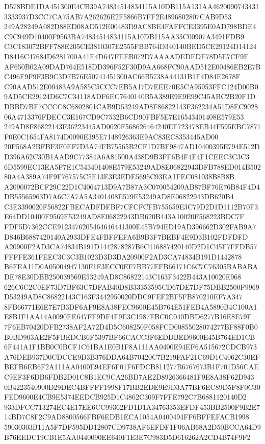 \documentclass[UTF8,fontset=fandol,zihao=-4,a4paper]{ctexart}
\begin{document}
{{D578BDE1DA451300E4CB39A74834514834115A10DB115A131AA46200907434313333937D3CC7CA75AB7A262626E2F5866B7FF2E4896802807CAB9D53
249A28249A082D88ED08AD512E00483D9AC8BE4FAFFCE3395E0AD798BDE4C9C949D10400F9563BA74834514834115A10DB115AA35C00907A3491FDB9
C3C183072BFF788E205CE3810307E2555FBB764D340140BED5CE29124D14124D8416C47684D6281700A41E4D647FEEB072D7AAAADEDEDE78D5E7CF9F
AF650B02A09DAD764E518DD396F52F30D9AA668FC90AAD512E00486EB2E7BC496F9F9F3B9C3D7B76E50741451300AC66B5738A44131B1F4D84E2678F
C90AAD512E00483A9A585C5CCC7EB5A17D7EEE70E5CA95953FFC124D00B09AD5CE29124D6C7C34118ADF6EC7640140B5A389E9E9E99C45ABC2B20F1D
DBBD7BF7CCCC8C6802801CAB9D53249AD8F86822143F362234A51D8EC902806A4713376FDECC3E167CD9C7532B6CD90FBF5E7E16543401408E579E53
249AD8F86822143F36223445AD0020F568626464240EF723478EB44F595EBC7871F0E0C1654FA8174D0090E395E7148926363E9AC83EC8353445AD00
20F568A2BFBF3F0EF7D3A74FB75565B2CF1D7BF9847AD10400395E794E512DD396A62C30B1AAD9C77384A6A81500A438D9B3FF6B4F4F4F1CEEC3C3C3
6D5599EC13EA5F7E1C543401408E579E53249AD8E06822943DFB788ED014B50280A4A389A74F9F767575C5E13E3E3EDE5695C93EA1FEC081038B8B8B
A2090072BCF29C22D1C4064713D9A7B87A3C070054209AB87BF76E76B84F4D4DB55565963D7A6C7A7A5A3401408E579E53249AD8E06822943DB620B4
C3E3390020F56822FBECADFDFBF7CFCFCFB755659E3C79D2D1D1112B70F3E64DD10400F9569E53249AD8E06822943DB620B443A10020F568223BDC7F
FDF5D7362CCE9123476205464646441300E45B794ED19AD396662D302FAB9A7D846B6887420140A2933DFE4FBFFEFA6B9B3F7BEBF4E9D3B102FDFDFD
A20900F2AD3CA74834B191D1442878287B6C416887420140D2D1C45F7FFDB57FFFFE361FEEC3C3C3B1023D3D3DA20900F2AD3CA74834B191D1442878
B6FEA11D0A05004947130F1F3ECC0EF7BB77EFB66171C6C7C76305BABABADE78E30DBB250039569E53249AD8C86822143C163F3422B443A10020E968
626C6C2C0EF73D7BF63C7DFAB40D8B33353595CD67DE7DF75DBB2500F9969D53249AD8C86822143C163F3442950020DDC9FEF2BF5FB870210EF7A347
8FB66771E6E7E7B3DF6AF9E8A38FEC9600E45B764E51FEB4A5890B4C100A1E8B1F1AA14A0090EE647FF9DF4F9E3C1987FBC0C040DBD6277B16E8E79F
7F6EB70420DFB2738AF2A72D4D5C608250F058FCD00855028074277BF88F0B0B0BD903AE2F5FBEDCB6F5397BF66CACC3F6EDDBED9600E45B764ED1CB
6F441A1F1BB0C0BCF1C61BA1E0B1F8A111AA0400E94EF6A515672CDCB973A76DEB937D0CDCCE9D3B376DDA64B70420C7B219FAF21C69D1C4062C30EF
BEFB6EB6F2A111AA0400E94EF6F01F6FDCB811277B6767673B1F701D56CAEC9EF3F6DB6FDB2D01C8B1EC9CA26BD7AE2D8926366481F9E8A38F62D943
0B4223540900D29DEC4BFFFF1998F17BB2EDE9E9D3A77BF6EC89D5F8F0C30FED9600E4CB9E5374EEDCB925D1C4862C309F7FFE792C7B6881120140D2
933DFCC713274EC4E17EE6CC99362FD1D1A34763353EFDF453BB2500F9B2E714BD7C8F2C9AD8800566FBF6EDB1ECA1054A0400494FF6BFFEFACB1998
59030303B11A5F7DF595DD12807CD9738AF6EFDF1F06AB68A2D50BCCA64D9B76EEDC19CB1E5AA0440090EE640F1E3E7C983D5D616262A2CD4B74F9F2
}}
\end{document}
